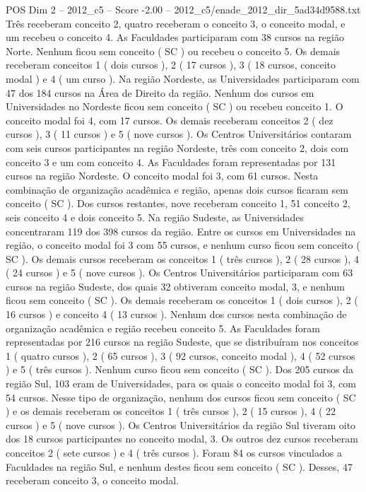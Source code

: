 \begin{textsample}{POS Dim 2 – 2012\_c5 – Score -2.00 – 2012\_c5/enade\_2012\_dir\_5ad34d9588.txt}
Três receberam conceito 2, quatro receberam o conceito 3, o conceito modal, e um recebeu o conceito 4.
As Faculdades participaram com 38 cursos na região Norte.
Nenhum ficou sem conceito ( SC ) ou recebeu o conceito 5.
Os demais receberam conceitos 1 ( dois cursos ), 2 ( 17 cursos ), 3 ( 18 cursos, conceito modal ) e 4 ( um curso ).
Na região Nordeste, as Universidades participaram com 47 dos 184 cursos na Área de Direito da região.
Nenhum dos cursos em Universidades no Nordeste ficou sem conceito ( SC ) ou recebeu conceito 1.
O conceito modal foi 4, com 17 cursos.
Os demais receberam conceitos 2 ( dez cursos ), 3 ( 11 cursos ) e 5 ( nove cursos ).
Os Centros Universitários contaram com seis cursos participantes na região Nordeste, três com conceito 2, dois com conceito 3 e um com conceito 4.
As Faculdades foram representadas por 131 cursos na região Nordeste.
O conceito modal foi 3, com 61 cursos.
Nesta combinação de organização acadêmica e região, apenas dois cursos ficaram sem conceito ( SC ).
Dos cursos restantes, nove receberam conceito 1, 51 conceito 2, seis conceito 4 e dois conceito 5.
Na região Sudeste, as Universidades concentraram 119 dos 398 cursos da região.
Entre os cursos em Universidades na região, o conceito modal foi 3 com 55 cursos, e nenhum curso ficou sem conceito ( SC ).
Os demais cursos receberam os conceitos 1 ( três cursos ), 2 ( 28 cursos ), 4 ( 24 cursos ) e 5 ( nove cursos ).
Os Centros Universitários participaram com 63 cursos na região Sudeste, dos quais 32 obtiveram conceito modal, 3, e nenhum ficou sem conceito ( SC ).
Os demais receberam os conceitos 1 ( dois cursos ), 2 ( 16 cursos ) e conceito 4 ( 13 cursos ).
Nenhum dos cursos nesta combinação de organização acadêmica e região recebeu conceito 5.
As Faculdades foram representadas por 216 cursos na região Sudeste, que se distribuíram nos conceitos 1 ( quatro cursos ), 2 ( 65 cursos ), 3 ( 92 cursos, conceito modal ), 4 ( 52 cursos ) e 5 ( três cursos ).
Nenhum curso ficou sem conceito ( SC ).
Dos 205 cursos da região Sul, 103 eram de Universidades, para os quais o conceito modal foi 3, com 54 cursos.
Nesse tipo de organização, nenhum dos cursos ficou sem conceito ( SC ) e os demais receberam os conceitos 1 ( três cursos ), 2 ( 15 cursos ), 4 ( 22 cursos ) e 5 ( nove cursos ).
Os Centros Universitários da região Sul tiveram oito dos 18 cursos participantes no conceito modal, 3.
Os outros dez cursos receberam conceitos 2 ( sete cursos ) e 4 ( três cursos ).
Foram 84 os cursos vinculados a Faculdades na região Sul, e nenhum destes ficou sem conceito ( SC ).
Desses, 47 receberam conceito 3, o conceito modal.

\end{textsample}
